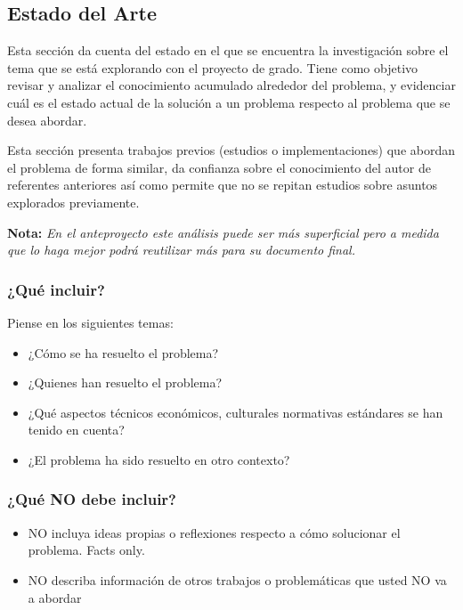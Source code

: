 \subsection{Estado del Arte}
Esta sección da cuenta del estado en el que se encuentra la investigación sobre el tema que se está explorando con el proyecto de grado. Tiene como objetivo revisar y analizar el conocimiento acumulado alrededor del problema, y evidenciar cuál es el estado actual de la solución a un problema respecto al problema que se desea abordar. 

Esta sección presenta trabajos previos (estudios o implementaciones) que abordan el problema de forma similar, da confianza sobre el conocimiento del autor de referentes anteriores así como permite que no se repitan estudios sobre asuntos explorados previamente.

\textbf{Nota:} \textit{En el anteproyecto este análisis puede ser más superficial pero a medida que lo haga mejor podrá reutilizar más para su documento final.}

\subsubsection*{¿Qué incluir?}
Piense en los siguientes temas:
\begin{itemize}
    \item ¿Cómo se ha resuelto el problema?
    \item ¿Quienes han resuelto el problema?
    \item ¿Qué aspectos técnicos económicos, culturales normativas estándares se han tenido en cuenta?
    \item ¿El problema ha sido resuelto en otro contexto?
\end{itemize}

\subsubsection*{¿Qué NO debe incluir?}
\begin{itemize}
    \item NO incluya ideas propias o reflexiones respecto a cómo solucionar el problema. Facts only. 
    \item NO describa información de otros trabajos o problemáticas que usted NO va a abordar 
\end{itemize}

